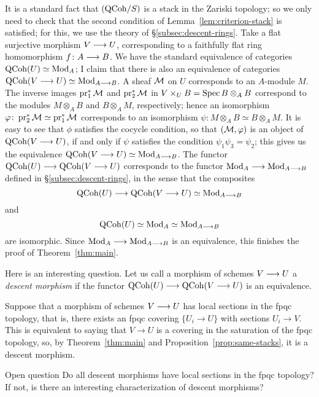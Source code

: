 \begin{4   STACKS}
\begin{4.2 Descent for quasi-coherent sheaves}
It is a standard fact that $({\mathrm{QCoh}/S})$ is a stack in the Zariski topology; so we only need to check that the second condition of Lemma~\ref{lem:criterion-stack} is satisfied; for this, we use the theory of \S\ref{subsec:descent-rings}. Take a flat surjective morphism $V \arr U$, corresponding to a faithfully flat ring homomorphism $f \colon A \arr B$. We have the standard equivalence of categories $\operatorname{QCoh}(U) \simeq \mathrm{Mod}_{A}$; I claim that there is also an equivalence of categories $\qcoh{V \arr U} \simeq \catmod{A \arr B}$. A \qc sheaf $\mathcal{M}$ on $U$ corresponds to an $A$-module $M$. The inverse images $\operatorname{pr}_1^* \mathcal{M}$ and  $\operatorname{pr}_2^* \mathcal{M}$ in $V \times_U B = \operatorname{Spec} B \otimes_A B$ correspond to the modules $M \otimes_A B$ and $B \otimes_A M$, respectively; hence an isomorphism $\varphi\colon \operatorname{pr}_2^* \mathcal{M} \simeq \operatorname{pr}_1^* \mathcal{M}$ corresponds to an isomorphism $\psi \colon M \otimes_A B \simeq B \otimes_A M$. It is easy to see that $\phi$ satisfies the cocycle condition, so that $(\mathcal{M}, \varphi)$ is an object of $\qcoh{V\arr U}$, if and only if $\psi$ satisfies the condition $\psi_1\psi_3 = \psi_2$; this gives us the equivalence $\qcoh{V \arr U} \simeq \catmod{A \arr B}$. The functor $\qcoh U \arr \qcoh{V \arr U}$ corresponds to the functor $\catmod{A} \arr \catmod{A \arr B}$ defined in \S\ref{subsec:descent-rings}, in the sense that the composites
   \[
   \qcoh U \arr \qcoh{V \arr U} \simeq \catmod{A \arr B}
   \]
and
   \[
   \qcoh U \simeq \catmod{A} \simeq \catmod{A \arr B}
   \]
are isomorphic. Since $\catmod{A} \arr \catmod{A \arr B}$ is an equivalence, this finishes the proof of Theorem~\ref{thm:main}.

Here is an interesting question. Let us call a morphism of schemes $V \arr U$ a  \emph{descent morphism} if the functor $\qcoh{U} \arr \qcoh{V \to U}$ is an equivalence.

Suppose that a morphism of schemes $V \arr U$ has local sections in the fpqc topology, that is, there exists an fpqc covering $\{U_{i} \to U\}$ with sections $U_{i} \to V$. This is equivalent to saying that $V \to U$ is a covering in the saturation of the fpqc topology, so, by Theorem~\ref{thm:main} and Proposition~\ref{prop:same-stacks}, it is a descent morphism.

\begin{namedr}{Open question}
Do all descent morphisms have local sections in the fpqc topology? If not, is there an interesting characterization of descent morphisms?
\end{namedr}



\end{4.2 Descent for quasi-coherent sheaves}
\end{4   STACKS}
